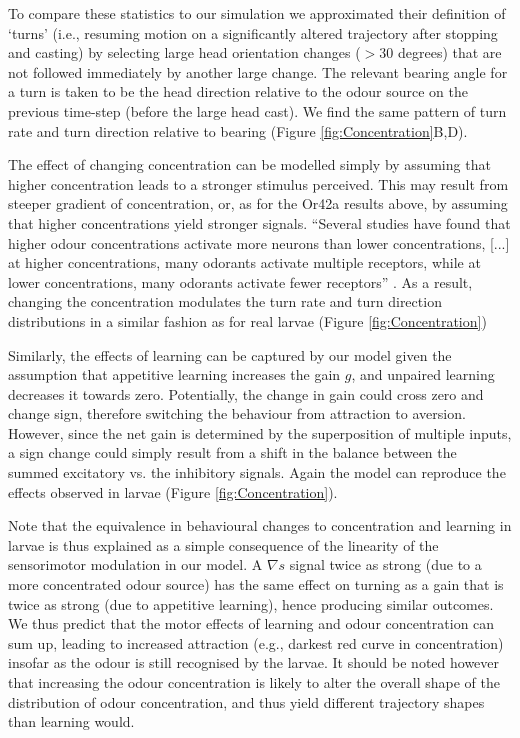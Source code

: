 \documentclass[11pt,a4paper]{article}
\newcommand{\todoBW}[1]{\todo[author=BW,color=orange, size=\tiny,inline]{1}}
\begin{document}
 To compare these statistics to our simulation we approximated their definition of ‘turns’ (i.e., resuming motion on a significantly altered trajectory after stopping and casting) by selecting large head orientation changes ($>30$ degrees) that are not followed immediately by another large change. The relevant bearing angle for a turn is taken to be the head direction relative to the odour source on the previous time-step (before the large head cast). We find the same pattern of turn rate and turn direction relative to bearing (Figure \ref{fig:Concentration}B,D).

The effect of changing concentration can be modelled simply by assuming that higher concentration leads to a stronger stimulus perceived. This may result from steeper gradient of concentration, or, as for the Or42a results above, by assuming that higher concentrations yield stronger signals.  “Several studies have found that higher odour concentrations activate more neurons than lower concentrations, [...] at higher concentrations, many odorants activate multiple receptors, while at lower concentrations, many odorants activate fewer receptors” \citep{hallem2006coding}.
 As a result, changing the concentration modulates the turn rate and turn direction distributions in a similar fashion as for real larvae (Figure \ref{fig:Concentration})

Similarly, the effects of learning can be captured by our model given the assumption that appetitive learning increases the gain $g$, 
and unpaired learning decreases it towards zero. Potentially, the change in gain could cross zero and change sign, therefore switching the behaviour from attraction to aversion. 
However, since the net gain is determined by the superposition of multiple inputs,
\todoBW{So far we haven't said anything about multiple inputs or net gain}
 a sign change could simply result from a shift in the balance between the summed excitatory vs. the inhibitory signals. Again the model can reproduce the effects observed in larvae (Figure \ref{fig:Concentration}). 

Note that the equivalence in behavioural changes to concentration and learning in larvae is thus explained as a simple consequence of the linearity of the sensorimotor modulation in our model. A $\nabla s$ signal twice as strong (due to a more concentrated odour source) has the same effect on turning as a gain that is twice as strong (due to appetitive learning), hence producing similar outcomes. We thus predict that the motor effects of learning and odour concentration can sum up, leading to increased attraction (e.g., darkest red curve in concentration) insofar as the odour is still recognised by the larvae. It should be noted however that increasing the odour concentration is likely to alter the overall shape of the distribution of odour concentration, and thus yield different trajectory shapes than learning would.
\end{document}
